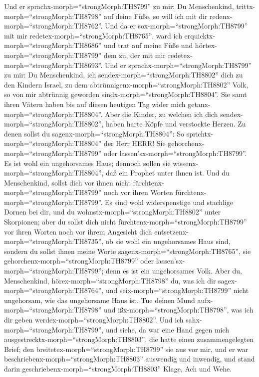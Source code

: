  Und er sprachx-morph=``strongMorph:TH8799'' zu mir: Du
Menschenkind, trittx-morph=``strongMorph:TH8798'' auf deine Füße, so
will ich mit dir redenx-morph=``strongMorph:TH8762''.  Und
da er sox-morph=``strongMorph:TH8799'' mit mir
redetex-morph=``strongMorph:TH8765'', ward ich
erquicktx-morph=``strongMorph:TH8686'' und trat auf meine Füße und
hörtex-morph=``strongMorph:TH8799'' dem zu, der mit mir
redetex-morph=``strongMorph:TH8693''.  Und er
sprachx-morph=``strongMorph:TH8799'' zu mir: Du Menschenkind, ich
sendex-morph=``strongMorph:TH8802'' dich zu den Kindern Israel, zu dem
abtrünnigenx-morph=``strongMorph:TH8802'' Volk, so von mir abtrünnig
geworden sindx-morph=``strongMorph:TH8804''. Sie samt ihren Vätern haben
bis auf diesen heutigen Tag wider mich
getanx-morph=``strongMorph:TH8804''.  Aber die Kinder, zu
welchen ich dich sendex-morph=``strongMorph:TH8802'', haben harte Köpfe
und verstockte Herzen. Zu denen sollst du
sagenx-morph=``strongMorph:TH8804'': So
sprichtx-morph=``strongMorph:TH8804'' der Herr HERR!  Sie
gehorchenx-morph=``strongMorph:TH8799'' oder
lassen'sx-morph=``strongMorph:TH8799''. Es ist wohl ein ungehorsames
Haus; dennoch sollen sie wissenx-morph=``strongMorph:TH8804'', daß ein
Prophet unter ihnen ist.  Und du Menschenkind, sollst dich
vor ihnen nicht fürchtenx-morph=``strongMorph:TH8799'' noch vor ihren
Worten fürchtenx-morph=``strongMorph:TH8799''. Es sind wohl
widerspenstige und stachlige Dornen bei dir, und du
wohnstx-morph=``strongMorph:TH8802'' unter Skorpionen; aber du sollst
dich nicht fürchtenx-morph=``strongMorph:TH8799'' vor ihren Worten noch
vor ihrem Angesicht dich entsetzenx-morph=``strongMorph:TH8735'', ob sie
wohl ein ungehorsames Haus sind,  sondern du sollst ihnen
meine Worte sagenx-morph=``strongMorph:TH8765'', sie
gehorchenx-morph=``strongMorph:TH8799'' oder
lassen'sx-morph=``strongMorph:TH8799''; denn es ist ein ungehorsames
Volk.  Aber du, Menschenkind,
hörex-morph=``strongMorph:TH8798'' du, was ich dir
sagex-morph=``strongMorph:TH8764'', und
seix-morph=``strongMorph:TH8799'' nicht ungehorsam, wie das ungehorsame
Haus ist. Tue deinen Mund aufx-morph=``strongMorph:TH8798'' und
ißx-morph=``strongMorph:TH8798'', was ich dir geben
werdex-morph=``strongMorph:TH8802''.  Und ich
sahx-morph=``strongMorph:TH8799'', und siehe, da war eine Hand gegen
mich ausgestrecktx-morph=``strongMorph:TH8803'', die hatte einen
zusammengelegten Brief;  den
breitetex-morph=``strongMorph:TH8799'' sie aus vor mir, und er war
beschriebenx-morph=``strongMorph:TH8803'' auswendig und inwendig, und
stand darin geschriebenx-morph=``strongMorph:TH8803'' Klage, Ach und
Wehe.

